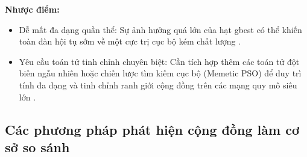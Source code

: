 \documentclass[14pt,a4paper]{extarticle}
\begin{document}
\textbf{Nhược điểm:}
    \begin{itemize}
        \item Dễ mất đa dạng quần thể: Sự ảnh hưởng quá lớn của hạt gbest có thể khiến toàn đàn hội tụ sớm về một cực trị cục bộ kém chất lượng \cite{Baraa2021, Beldi2025}.
        \item Yêu cầu toán tử tinh chỉnh chuyên biệt: Cần tích hợp thêm các toán tử đột biến ngẫu nhiên hoặc chiến lược tìm kiếm cục bộ (Memetic PSO) để duy trì tính đa dạng và tinh chỉnh ranh giới cộng đồng trên các mạng quy mô siêu lớn \cite{Baraa2021, Beldi2025}.
    \end{itemize}

\subsection{Các phương pháp phát hiện cộng đồng làm cơ sở so sánh}
\end{document}
